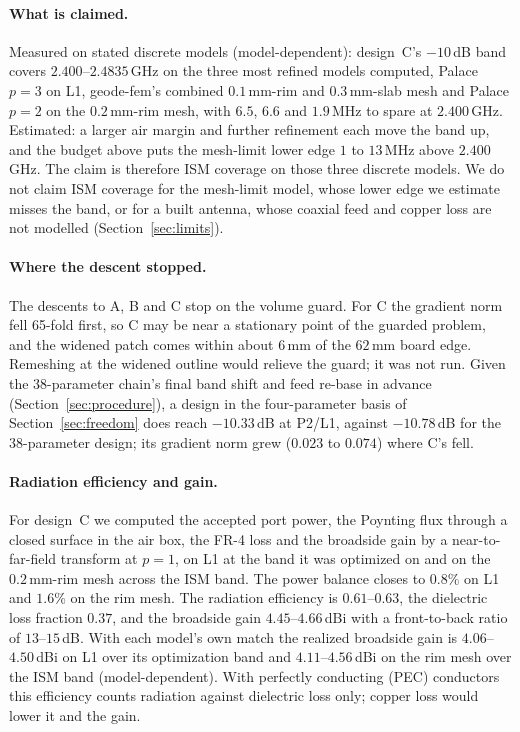 \documentclass{anvil-paper}
\newcommand{\PL}{P2/L1}
\begin{document}
\paragraph{What is claimed.}
Measured on stated discrete models (model-dependent): design~C's $-10$\,dB
band covers $2.400$--$2.4835$\,GHz on the three most refined models computed,
Palace $p = 3$ on L1, geode-fem's combined $0.1$\,mm-rim and $0.3$\,mm-slab
mesh and Palace $p = 2$ on the $0.2$\,mm-rim mesh, with $6.5$, $6.6$ and
$1.9$\,MHz to spare at $2.400$\,GHz. Estimated: a larger air margin and
further refinement each move the band up, and the budget above puts the
mesh-limit lower edge $1$ to $13$\,MHz above $2.400$\,GHz. The claim is
therefore ISM coverage on those three discrete models. We do not claim ISM
coverage for the mesh-limit model, whose lower edge we estimate misses the
band, or for a built antenna, whose coaxial feed and copper loss are not
modelled (Section~\ref{sec:limits}).

\paragraph{Where the descent stopped.}
The descents to A, B and C stop on the volume guard. For C the gradient norm fell 65-fold first, so C may be
near a stationary point of the guarded problem, and the widened patch comes
within about $6$\,mm of the $62$\,mm board edge. Remeshing at the widened
outline would relieve the guard; it was not run. Given the 38-parameter
chain's final band shift and feed re-base in advance
(Section~\ref{sec:procedure}), a design in the four-parameter basis of
Section~\ref{sec:freedom} does reach $-10.33$\,dB at \PL{}, against
$-10.78$\,dB for the 38-parameter design; its gradient norm grew ($0.023$
to $0.074$) where C's fell.

\paragraph{Radiation efficiency and gain.}
For design~C we computed the accepted port power, the Poynting flux through
a closed surface in the air box, the FR-4 loss and the broadside gain by a
near-to-far-field transform at $p = 1$, on L1 at the band it was optimized
on and on the $0.2$\,mm-rim mesh across the ISM band. The power balance
closes to $0.8\%$ on L1 and $1.6\%$ on the rim mesh. The radiation
efficiency is $0.61$--$0.63$, the dielectric loss fraction $0.37$, and the
broadside gain $4.45$--$4.66$\,dBi with a front-to-back ratio of
$13$--$15$\,dB. With each model's own match the realized broadside gain is
$4.06$--$4.50$\,dBi on L1 over its optimization band and $4.11$--$4.56$\,dBi
on the rim mesh over the ISM band (model-dependent). With perfectly
conducting (PEC) conductors this efficiency counts radiation against dielectric loss only;
copper loss would lower it and the gain.
\end{document}
